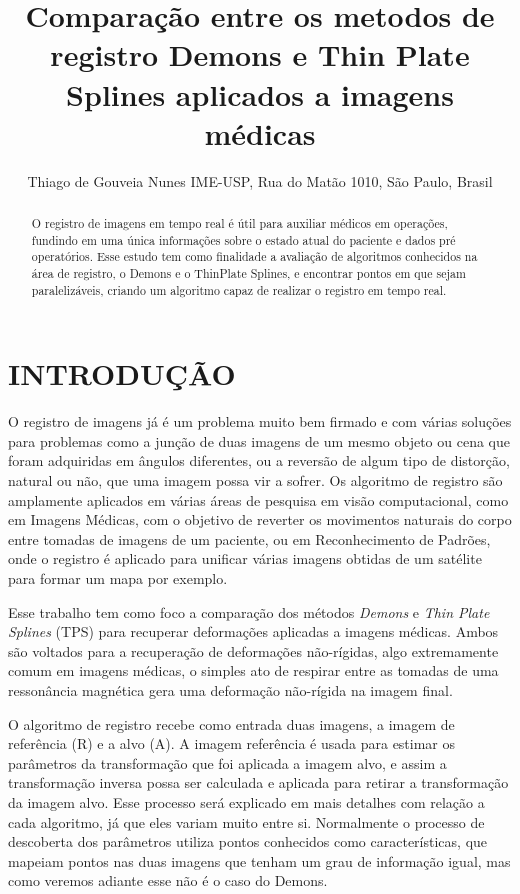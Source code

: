 \documentclass[]{spie}  %
\title{Comparação entre os metodos de registro Demons e Thin Plate Splines aplicados a imagens médicas}
\author{Thiago de Gouveia Nunes\supit{1}
\skiplinehalf
\supit{1}IME-USP, Rua do Matão 1010, São Paulo, Brasil \\
}
\begin{document}
 
  \maketitle 

\begin{abstract}
O registro de imagens em tempo real é útil para auxiliar médicos em operações, fundindo em uma única informações
sobre o estado atual do paciente e dados pré operatórios. Esse estudo tem como finalidade a avaliação de algoritmos 
conhecidos na área de registro, o Demons e o ThinPlate Splines, e encontrar pontos em que sejam paralelizáveis, criando
um algoritmo capaz de realizar o registro em tempo real.
\end{abstract}



\section{INTRODUÇÃO}
\label{sec:intro}  %

O registro de imagens já é um problema muito bem firmado e com várias soluções para problemas como a junção de duas 
imagens de um mesmo objeto ou cena que foram adquiridas em ângulos diferentes, ou a reversão de algum tipo de 
distorção, natural ou não, que uma imagem possa vir a sofrer. Os algoritmo de registro são amplamente aplicados
em várias áreas de pesquisa em visão computacional, como em Imagens Médicas, com o objetivo de reverter os
movimentos naturais do corpo entre tomadas de imagens de um paciente, ou em Reconhecimento de Padrões, onde o
registro é aplicado para unificar várias imagens obtidas de um satélite para formar um mapa por exemplo.

Esse trabalho tem como foco a comparação dos métodos \textit{Demons} e \textit{Thin Plate Splines} (TPS) para recuperar
deformações aplicadas a imagens médicas. Ambos são voltados para a recuperação de deformações não-rígidas, algo 
extremamente comum em imagens médicas, o simples ato de respirar entre as tomadas de uma ressonância magnética gera
uma deformação não-rígida na imagem final. 

O algoritmo de registro recebe como entrada duas imagens, a imagem de referência (R) e a alvo (A). A imagem referência
é usada para estimar os parâmetros da transformação que foi aplicada a imagem alvo, e assim a transformação
inversa possa ser calculada e aplicada para retirar a transformação da imagem alvo. Esse processo será explicado
em mais detalhes com relação a cada algoritmo, já que eles variam muito entre si. Normalmente o processo de
descoberta dos parâmetros utiliza pontos conhecidos como características, que mapeiam pontos nas duas imagens que
tenham um grau de informação igual, mas como veremos adiante esse não é o caso do Demons.
\end{document}
